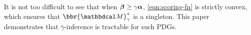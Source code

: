 \documentclass{article}
\newcommand\discard[1]{}
\newcommand\zogamma{{\bar\gamma}}
\begin{document}
It is not too difficult to see that when $\boldsymbol\beta \ge \gamma\boldsymbol\alpha$, 
 \eqref{eqn:scoring-fn} is strictly convex, which ensures that
 $\bbr{\dg M}^*_\gamma$ is a singleton.
This paper demonstrates that
$\zogamma$-inference
is tractable for such PDGs.
%
\discard{%
    The former is a notational convenience,
    because for $\gamma \in (0, \infty)$,
    $\gamma$-inference is just $1$-inference for a
    slightly different PDG:
    $\bbr{
        \balpha, \bbeta}^*_\gamma = \bbr{
        \gamma \balpha, \bbeta}^*_1$.
    This paper demonstrates the tractability of
    1-inference for the specific case of PDGs satisfying $\bbeta \ge \balpha$, which is sufficient to ensure strict convexity of \eqref{eqn:scoring-fn}, and hence a unique optimal distribution.}%
\end{document}
